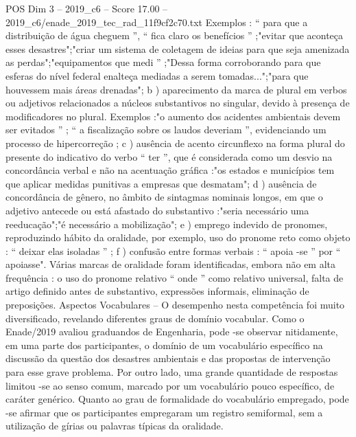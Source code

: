 \begin{textsample}{POS Dim 3 – 2019\_c6 – Score 17.00 – 2019\_c6/enade\_2019\_tec\_rad\_11f9cf2c70.txt}
Exemplos : “ para que a distribuição de água cheguem ”, “ fica claro os benefícios ” ;"evitar que aconteça esses desastres";"criar um sistema de coletagem de ideias para que seja amenizada as perdas";"equipamentos que medi ” ;"Dessa forma corroborando para que esferas do nível federal enalteça mediadas a serem tomadas...";"para que houvessem mais áreas drenadas"; b ) aparecimento da marca de plural em verbos ou adjetivos relacionados a núcleos substantivos no singular, devido à presença de modificadores no plural.
Exemplos :"o aumento dos acidentes ambientais devem ser evitados ” ; “ a fiscalização sobre os laudos deveriam ”, evidenciando um processo de hipercorreção ; c ) ausência de acento circunflexo na forma plural do presente do indicativo do verbo “ ter ”, que é considerada como um desvio na concordância verbal e não na acentuação gráfica :"os estados e municípios tem que aplicar medidas punitivas a empresas que desmatam"; d ) ausência de concordância de gênero, no âmbito de sintagmas nominais longos, em que o adjetivo antecede ou está afastado do substantivo :"seria necessário uma reeducação";"é necessário a mobilização"; e ) emprego indevido de pronomes, reproduzindo hábito da oralidade, por exemplo, uso do pronome reto como objeto : “ deixar elas isoladas ” ; f ) confusão entre formas verbais : “ apoia -se ” por “ apoiasse".
Várias marcas de oralidade foram identificadas, embora não em alta frequência : o uso do pronome relativo “ onde ” como relativo universal, falta de artigo definido antes de substantivo, expressões informais, eliminação de preposições.
Aspectos Vocabulares – O desempenho nesta competência foi muito diversificado, revelando diferentes graus de domínio vocabular.
Como o Enade/2019 avaliou graduandos de Engenharia, pode -se observar nitidamente, em uma parte dos participantes, o domínio de um vocabulário específico na discussão da questão dos desastres ambientais e das propostas de intervenção para esse grave problema.
Por outro lado, uma grande quantidade de respostas limitou -se ao senso comum, marcado por um vocabulário pouco específico, de caráter genérico.
Quanto ao grau de formalidade do vocabulário empregado, pode -se afirmar que os participantes empregaram um registro semiformal, sem a utilização de gírias ou palavras típicas da oralidade.

\end{textsample}
